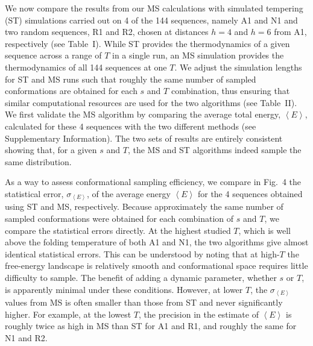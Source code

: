 \documentclass[
aip,
rsi,%
amsmath,amssymb,
reprint,%
]{revtex4-1}
\newcommand	 {\sbar}	{{s}}
\newcommand	 {\kb}		{{k_\mathrm{B}}}
\newcommand {\sigE}	{{\sigma_{\left < E \right >}}}
\begin{document}
We now compare the results from our MS calculations with simulated tempering (ST) simulations carried out on 4 of the 144 sequences, namely A1 and N1 and two random sequences, R1 and R2, chosen at distances $h=4$ and $h=6$ from A1, respectively (see Table~I). While ST provides the thermodynamics of a given sequence across a range of $T$ in a single run, an MS simulation provides the thermodynamics of all 144 sequences at one $T$. We adjust the simulation lengths for ST and MS runs such that roughly the same number of sampled conformations are obtained for each $\sbar$ and $T$ combination, thus ensuring that similar computational resources are used for the two algorithms (see Table~II). We first validate the MS algorithm by comparing the average total energy, $\left < E \right >$, calculated for these 4 sequences with the two different methods (see Supplementary Information). The two sets of results are entirely consistent showing that, for a given $\sbar$ and $T$, the MS and ST algorithms indeed sample the same distribution. 

As a way to assess conformational sampling efficiency, we compare in Fig.~4 the statistical error, $\sigE$, of the average energy $\left <E\right >$ for the 4 sequences obtained using ST and MS, respectively. Because approximately the same number of sampled conformations were obtained for each combination of $\sbar$ and $T$, we compare the statistical errors directly. At the highest studied $T$, which is well above the folding temperature of both A1 and N1, the two algorithms give almost identical statistical errors. This can be understood by noting that at high-$T$ the free-energy landscape is relatively smooth and conformational space requires little difficulty to sample. The benefit of adding a dynamic parameter, whether $\sbar$ or $T$, is apparently minimal under these conditions. However, at lower $T$, the $\sigE$ values from MS is often smaller than those from ST and never significantly higher. For example, at the lowest $T$, the precision in the estimate of $\left < E\right >$ is roughly twice as high in MS than ST for A1 and R1, and roughly the same for N1 and R2. 

\end{document}
